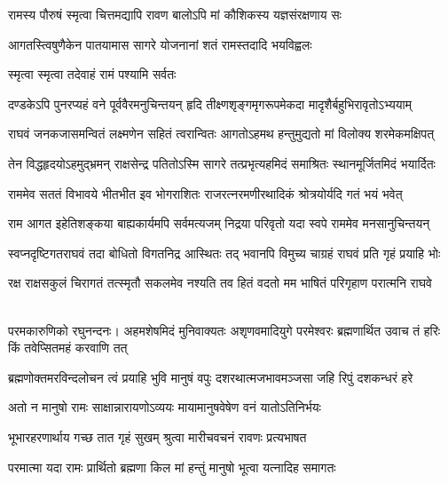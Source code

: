 \twolineshloka
{रामस्य पौरुषं स्मृत्वा चित्तमद्यापि रावण}
{बालोऽपि मां कौशिकस्य यज्ञसंरक्षणाय सः} %

\twolineshloka
{आगतस्त्विषुणैकेन पातयामास सागरे}
{योजनानां शतं रामस्तदादि भयविह्वलः} %

\onelineshloka
{स्मृत्वा स्मृत्वा तदेवाहं रामं पश्यामि सर्वतः} %


\fourlineindentedshloka
{दण्डकेऽपि पुनरप्यहं वने}
{पूर्ववैरमनुचिन्तयन् हृदि}
{तीक्ष्णशृङ्गमृगरूपमेकदा}
{मादृशैर्बहुभिरावृतोऽभ्ययाम्} %

\fourlineindentedshloka
{राघवं जनकजासमन्वितं}
{लक्ष्मणेन सहितं त्वरान्वितः}
{आगतोऽहमथ हन्तुमुद्यतो}
{मां विलोक्य शरमेकमक्षिपत्} %

\fourlineindentedshloka
{तेन विद्धहृदयोऽहमुद्भ्रमन्}
{राक्षसेन्द्र पतितोऽस्मि सागरे}
{तत्प्रभृत्यहमिदं समाश्रितः}
{स्थानमूर्जितमिदं भयार्दितः} %

\fourlineindentedshloka
{राममेव सततं विभावये}
{भीतभीत इव भोगराशितः}
{राजरत्नरमणीरथादिकं}
{श्रोत्रयोर्यदि गतं भयं भवेत्} %

\fourlineindentedshloka
{राम आगत इहेतिशङ्कया}
{बाह्यकार्यमपि सर्वमत्यजम्}
{निद्रया परिवृतो यदा स्वपे}
{राममेव मनसानुचिन्तयन्} %

\fourlineindentedshloka
{स्वप्नदृष्टिगतराघवं तदा}
{बोधितो विगतनिद्र आस्थितः}
{तद् भवानपि विमुच्य चाग्रहं}
{राघवं प्रति गृहं प्रयाहि भोः} %

\fourlineindentedshloka
{रक्ष राक्षसकुलं चिरागतं}
{तत्स्मृतौ सकलमेव नश्यति}
{तव हितं वदतो मम भाषितं}
{परिगृहाण परात्मनि राघवे}%

\begin{minipage}{\linewidth}
\centering
\hspace{-8ex}{त्यज विरोधमतिं भज भक्तितः}\\
{परमकारुणिको रघुनन्दनः।} 
\fourlineindentedshloka
{अहमशेषमिदं मुनिवाक्यतः}
{अशृणवमादियुगे परमेश्वरः}
{ब्रह्मणार्थित उवाच तं हरिः}
{किं तवेप्सितमहं करवाणि तत्} %
\end{minipage}

\fourlineindentedshloka
{ब्रह्मणोक्तमरविन्दलोचन}
{त्वं प्रयाहि भुवि मानुषं वपुः}
{दशरथात्मजभावमञ्जसा}
{जहि रिपुं दशकन्धरं हरे} %

\twolineshloka
{अतो न मानुषो रामः साक्षान्नारायणोऽव्ययः}
{मायामानुषवेषेण वनं यातोऽतिनिर्भयः} %

\twolineshloka
{भूभारहरणार्थाय गच्छ तात गृहं सुखम्}
{श्रुत्वा मारीचवचनं रावणः प्रत्यभाषत} %

\twolineshloka
{परमात्मा यदा रामः प्रार्थितो ब्रह्मणा किल}
{मां हन्तुं मानुषो भूत्वा यत्नादिह समागतः} %

